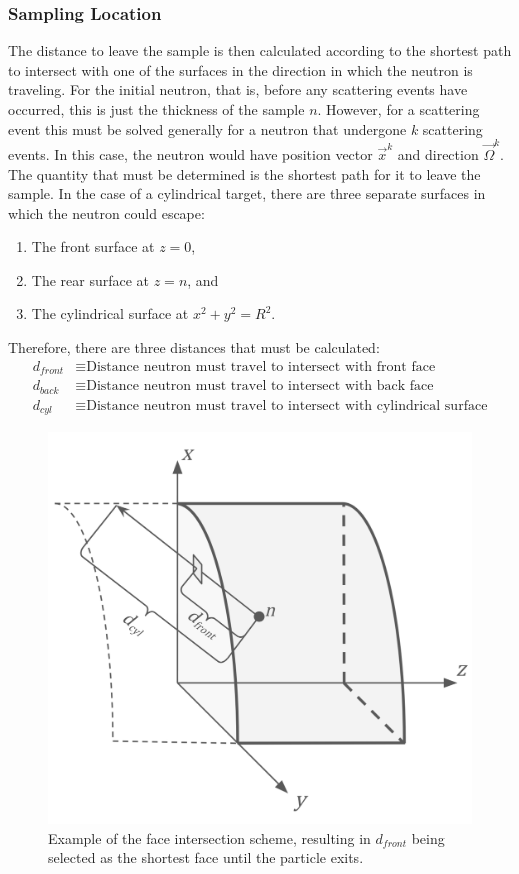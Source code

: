 \subsubsection{Sampling Location}
\label{sec:sampling-location-ms}
The distance to leave the sample is then calculated according to the shortest path to intersect with one of the surfaces in the direction in which the neutron is traveling. For the initial neutron, that is, before any scattering events have occurred, this is just the thickness of the sample $n$. However, for a scattering event this must be solved generally for a neutron that undergone $k$ scattering events. In this case, the neutron would have position vector $\overrightarrow{x}^k$ and direction $\overrightarrow{\Omega}^k$. The quantity that must be determined is the shortest path for it to leave the sample. In the case of a cylindrical target, there are three separate surfaces in which the neutron could escape:
\begin{enumerate}
    \item The front surface at $z=0$,
    \item The rear surface at $z=n$, and
    \item The cylindrical surface at $x^2 + y^2 = R^2$.
\end{enumerate}
Therefore, there are three distances that must be calculated:
\begin{align*}
    d_{front}   &\equiv \text{Distance neutron must travel to intersect with front face} \\
    d_{back}    &\equiv \text{Distance neutron must travel to intersect with back face} \\
    d_{cyl}     &\equiv \text{Distance neutron must travel to intersect with cylindrical surface}
\end{align*}
\begin{figure}[h]
    \centering
    \includegraphics[width=0.75\linewidth]{Figures/ms_face_intersection.png}
    \caption{Example of the face intersection scheme, resulting in $d_{front}$ being selected as the shortest face until the particle exits.}
    \label{fig:ms-face-intersection}
\end{figure}
